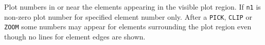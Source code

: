 \headb

Plot numbers in or near the elements appearing in the
visible plot region.  If {\tt n1} is non-zero plot number for specified
element number only.  After a {\tt PICK}, {\tt CLIP} or {\tt ZOOM} some
numbers may appear for elements surrounding the plot region
even though no lines for element edges are shown.
\vfill
\eject
